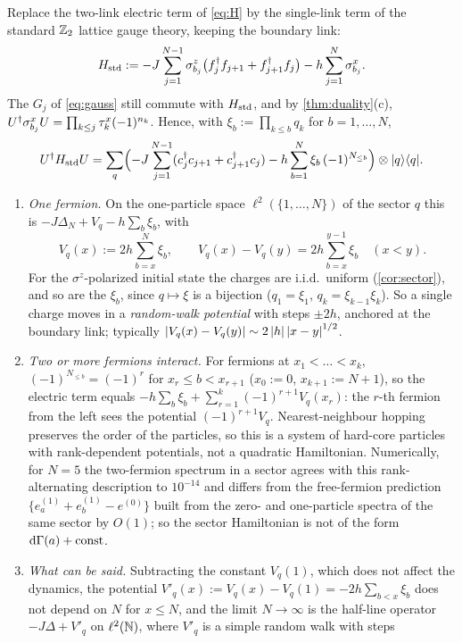 \begin{remark}\label{rem:randomwalk}
Replace the two-link electric term of \eqref{eq:H} by the single-link term of the standard $\mathbb{Z}_2$ lattice gauge
theory, keeping the boundary link:
\[
  H_{\rm std}:=-J\sum_{j=1}^{N-1}\sigma^{z}_{b_{j}}\bigl(f_j^\dagger f_{j+1}+f_{j+1}^\dagger f_j\bigr)-h\sum_{j=1}^N\sigma^{x}_{b_{j}}.
\]
The $G_j$ of \eqref{eq:gauss} still commute with $H_{\rm std}$, and by \cref{thm:duality}(c),
$U^\dagger\sigma^{x}_{b_{j}}U=\prod_{k\le j}\tau^{x}_{k}(-1)^{n_k}$.  Hence, with $\xi_b:=\prod_{k\le b}q_k$ for $b=1,\dots,N$,
\[
  U^\dagger H_{\rm std}U=\sum_q\Bigl(-J\sum_{j=1}^{N-1}(c_j^\dagger c_{j+1}+c_{j+1}^\dagger c_j)
  -h\sum_{b=1}^N\xi_b\,(-1)^{N_{\le b}}\Bigr)\otimes|q\rangle\langle q| .
\]
\begin{enumerate}[label=(\alph*)]
\item \emph{One fermion.}  On the one-particle space $\ell^2(\{1,\dots,N\})$ of the sector $q$ this is
$-J\Delta_N+V_q-h\sum_b\xi_b$, with
\[
  V_q(x):=2h\sum_{b=x}^N\xi_b,\qquad V_q(x)-V_q(y)=2h\sum_{b=x}^{y-1}\xi_b\quad(x<y).
\]
For the $\sigma^z$-polarized initial state the charges are i.i.d.\ uniform (\cref{cor:sector}), and so are the
$\xi_b$, since $q\mapsto\xi$ is a bijection ($q_1=\xi_1$, $q_k=\xi_{k-1}\xi_k$).  So a single charge moves in a
\emph{random-walk potential} with steps $\pm2h$, anchored at the boundary link; typically
$\left|V_q(x)-V_q(y)\right|\sim2\left|h\right|\left|x-y\right|^{1/2}$.
\item \emph{Two or more fermions interact.}  For fermions at $x_1<\dots<x_k$,
$(-1)^{N_{\le b}}=(-1)^r$ for $x_r\le b<x_{r+1}$ ($x_0:=0$, $x_{k+1}:=N+1$), so the electric term equals
$-h\sum_b\xi_b+\sum_{r=1}^k(-1)^{r+1}V_q(x_r)$: the $r$-th fermion from the left sees the potential
$(-1)^{r+1}V_q$.  Nearest-neighbour hopping preserves the order of the particles, so this is a system of hard-core
particles with rank-dependent potentials, not a quadratic Hamiltonian.  Numerically, for $N=5$ the two-fermion
spectrum in a sector agrees with this rank-alternating description to $10^{-14}$ and differs from the free-fermion
prediction $\{e^{(1)}_a+e^{(1)}_b-e^{(0)}\}$ built from the zero- and one-particle spectra of the same sector by
$O(1)$; so the sector Hamiltonian is not of the form $\mathrm{d}\Gamma(a)+\text{const}$.
\item \emph{What can be said.}  Subtracting the constant $V_q(1)$, which does not affect the dynamics, the
potential $V'_q(x):=V_q(x)-V_q(1)=-2h\sum_{b<x}\xi_b$ does not depend on $N$ for $x\le N$, and the limit $N\to\infty$
is the half-line operator $-J\Delta+V'_q$ on $\ell^2(\mathbb{N})$, where $V'_q$ is a simple random walk with steps

\end{enumerate}
\end{remark}
